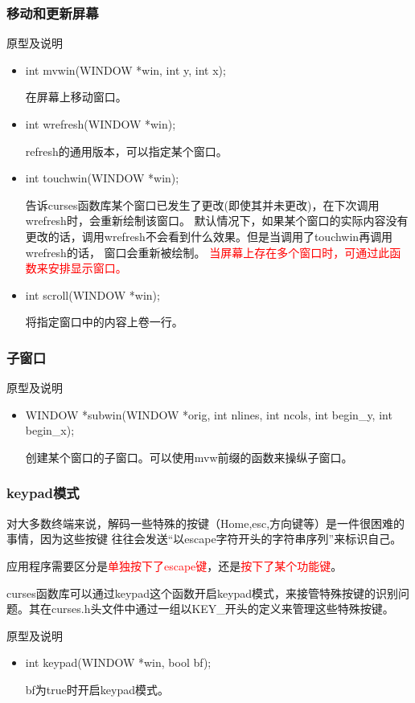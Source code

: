 \documentclass{beamer}
\begin{document}
\begin{frame}
\frametitle{移动和更新屏幕}

\begin{block}{原型及说明}
\begin{itemize}
\item
  int mvwin(WINDOW *win, int y, int x);
  
在屏幕上移动窗口。

\item
 int wrefresh(WINDOW *win);
 
refresh的通用版本，可以指定某个窗口。
\item
int touchwin(WINDOW *win);

告诉curses函数库某个窗口已发生了更改(即使其并未更改)，在下次调用wrefresh时，会重新绘制该窗口。
默认情况下，如果某个窗口的实际内容没有更改的话，调用wrefresh不会看到什么效果。但是当调用了touchwin再调用wrefresh的话，
窗口会重新被绘制。
\textcolor{red}{当屏幕上存在多个窗口时，可通过此函数来安排显示窗口。}
\item
int scroll(WINDOW *win);

将指定窗口中的内容上卷一行。

\end{itemize}
\end{block}

\end{frame}

\begin{frame}
\frametitle{子窗口}

\begin{block}{原型及说明}
\begin{itemize}
\item
 WINDOW *subwin(WINDOW *orig, int nlines, int ncols,
             int begin\_y, int begin\_x);
  

创建某个窗口的子窗口。可以使用mvw前缀的函数来操纵子窗口。
\end{itemize}
\end{block}

\end{frame}



\begin{frame}
\frametitle{keypad模式}
对大多数终端来说，解码一些特殊的按键（Home,esc,方向键等）是一件很困难的事情，因为这些按键
往往会发送“以escape字符开头的字符串序列”来标识自己。

应用程序需要区分是\textcolor{red}{单独按下了escape键}，还是\textcolor{red}{按下了某个功能键}。

curses函数库可以通过keypad这个函数开启keypad模式，来接管特殊按键的识别问题。其在curses.h头文件中通过一组以KEY\_开头的定义来管理这些特殊按键。
\begin{block}{原型及说明}
\begin{itemize}
\item
int keypad(WINDOW *win, bool bf);

bf为true时开启keypad模式。
\end{itemize}
\end{block}

\end{frame}
\end{document}
